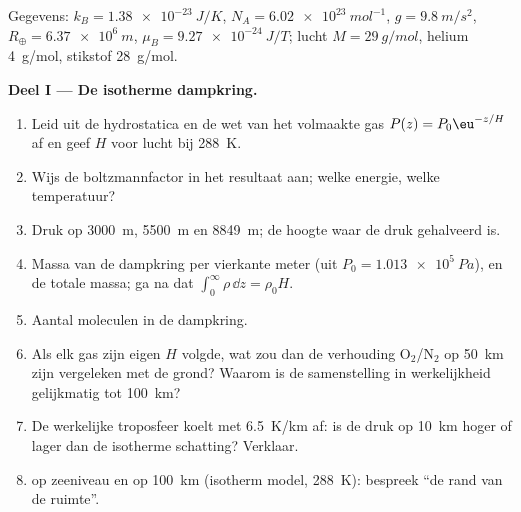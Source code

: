 \begin{problem}\label{pb:b2:boltzmann-factor:1}
Gegevens: $k_B = \qty{1.38e-23}{J/K}$, $N_A = \qty{6.02e23}{mol^{-1}}$,
$g =
\qty{9.8}{m/s^2}$, $R_{\oplus} = \qty{6.37e6}{m}$,
$\mu_B = \qty{9.27e-24}{J/T}$;
lucht $M = \qty{29}{g/mol}$, helium \qty{4}{g/mol}, stikstof \qty{28}{g/mol}.

\textbf{Deel I --- De isotherme dampkring.}
\begin{enumerate}
  \item Leid uit de hydrostatica en de wet van het volmaakte gas
        $P(z) =
        P_0\eu^{-z/H}$ af en geef $H$ voor lucht bij
        \qty{288}{K}.
  \item Wijs de boltzmannfactor in het resultaat aan; welke energie,
        welke temperatuur?
  \item Druk op \qty{3000}{m}, \qty{5500}{m} en \qty{8849}{m}; de
        hoogte waar de druk gehalveerd is.
  \item Massa van de dampkring per vierkante meter (uit
        $P_0 =
        \qty{1.013e5}{Pa}$), en de totale massa; ga na dat
        $\int_0^\infty
        \rho\,\dd z = \rho_0H$.
  \item Aantal moleculen in de dampkring.
  \item Als elk gas zijn eigen $H$ volgde, wat zou dan de verhouding
        O$_2$/N$_2$ op \qty{50}{km} zijn vergeleken met de grond? Waarom is de
        samenstelling in werkelijkheid gelijkmatig tot \qty{100}{km}?
  \item De werkelijke troposfeer koelt met \qty{6.5}{K/km} af: is de druk
        op \qty{10}{km} hoger of lager dan de isotherme schatting?
        Verklaar.
  \item {} op zeeniveau en op \qty{100}{km} (isotherm
        model, \qty{288}{K}): bespreek ``de rand van de ruimte''.
\end{enumerate}


\end{problem}
